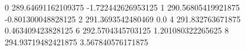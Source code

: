 0 289.64691162109375 -1.722442626953125
1 290.56805419921875 -0.801300048828125
2 291.3693542480469 0.0
4 291.832763671875 0.463409423828125
6 292.5704345703125 1.201080322265625
8 294.93719482421875 3.567840576171875
